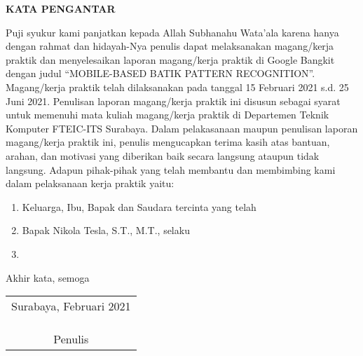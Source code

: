 \begin{center}
  \Large\textbf{KATA PENGANTAR}
\end{center}
\vspace{2ex}


Puji syukur kami panjatkan kepada Allah Subhanahu Wata'ala karena hanya dengan rahmat dan hidayah-Nya penulis dapat melaksanakan magang/kerja praktik dan menyelesaikan laporan magang/kerja praktik di Google Bangkit dengan judul “MOBILE-BASED BATIK PATTERN RECOGNITION”.
Magang/kerja praktik telah dilaksanakan pada tanggal 15 Februari 2021 s.d. 25 Juni 2021.
Penulisan laporan magang/kerja praktik ini disusun sebagai syarat untuk memenuhi mata kuliah magang/kerja praktik di Departemen Teknik Komputer FTEIC-ITS Surabaya.
Dalam pelakasanaan maupun penulisan laporan magang/kerja praktik ini, penulis mengucapkan terima kasih atas bantuan, arahan, dan motivasi yang diberikan baik secara langsung ataupun tidak langsung.
Adapun pihak-pihak yang telah membantu dan membimbing kami dalam pelaksanaan kerja praktik yaitu:

\begin{enumerate}[nolistsep]

  \item Keluarga, Ibu, Bapak dan Saudara tercinta yang telah \lipsum[3][1-2]

  \item Bapak Nikola Tesla, S.T., M.T., selaku \lipsum[3][3-4]

  \item \lipsum[3][5-7]

\end{enumerate}

Akhir kata, semoga \lipsum[4][1-8]

\begin{flushright}
  \begin{tabular}[b]{c}
    Surabaya, Februari 2021
    \\
    \\
    \\
    \\
    Penulis
  \end{tabular}
\end{flushright}
